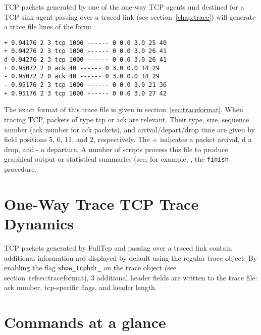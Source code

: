 TCP packets generated by one of the one-way TCP agents and destined for
a TCP sink agent
passing over a traced link (see section~\ref{chap:trace})
will generate a trace file lines of the form:
\begin{verbatim}
+ 0.94176 2 3 tcp 1000 ------ 0 0.0 3.0 25 40
+ 0.94276 2 3 tcp 1000 ------ 0 0.0 3.0 26 41
d 0.94276 2 3 tcp 1000 ------ 0 0.0 3.0 26 41
+ 0.95072 2 0 ack 40 ------ 0 3.0 0.0 14 29
- 0.95072 2 0 ack 40 ------ 0 3.0 0.0 14 29
- 0.95176 2 3 tcp 1000 ------ 0 0.0 3.0 21 36
+ 0.95176 2 3 tcp 1000 ------ 0 0.0 3.0 27 42
\end{verbatim}
The exact format of this trace file is given in section~\ref{sec:traceformat}.
When tracing TCP, packets of type {\sf tcp} or {\sf ack} are relevant.
Their type, size, sequence number (ack number for ack packets),
and arrival/depart/drop time are given by field positions
5, 6, 11, and 2, respectively.
The {\sf +} indicates a packet arrival, {\sf d} a drop, and {\sf -} a
departure.
A number of scripts process this file to produce graphical output or
statistical summaries (see,  for example, , the
{\tt finish} procedure.

\section{One-Way Trace TCP Trace Dynamics}
\label{sec:tcpdyn}

TCP packets generated by FullTcp and
passing over a traced link contain additional information not displayed
by default using the regular trace object.
By enabling the flag {\tt show\_tcphdr\_} on the trace object
(see section~ref{sec:traceformat}), 3 additional header fields are
written to the trace file: ack number, tcp-specific flags, and header length.


\section{Commands at a glance}
\label{sec:tcpcommand}

